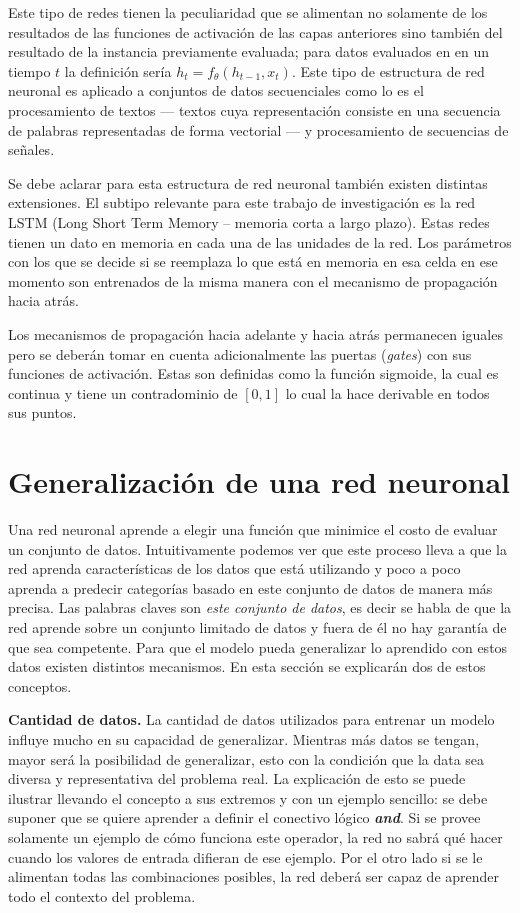 

Este tipo de redes tienen la peculiaridad que se alimentan no solamente de los resultados de las funciones de activación de las capas anteriores sino también del resultado de la instancia previamente evaluada; para datos evaluados en en un tiempo $t$ la definición sería $h_t = f_{\theta}(h_{t-1}, x_t)$. Este tipo de estructura de red neuronal es aplicado a conjuntos de datos secuenciales como lo es el procesamiento de textos --- textos cuya representación consiste en una secuencia de palabras representadas de forma vectorial --- y procesamiento de secuencias de señales.

Se debe aclarar para esta estructura de red neuronal también existen distintas extensiones. El subtipo relevante para este trabajo de investigación es la red LSTM (Long Short Term Memory -- memoria corta a largo plazo). Estas redes tienen un dato en memoria en cada una de las unidades de la red. Los parámetros con los que se decide si se reemplaza lo que está en memoria en esa celda en ese momento son entrenados de la misma manera con el mecanismo de propagación hacia atrás.

Los mecanismos de propagación hacia adelante y hacia atrás permanecen iguales pero se deberán tomar en cuenta adicionalmente las puertas (\textit{gates}) con sus funciones de activación. Estas son definidas como la función sigmoide, la cual es continua y tiene un contradominio de $[0,1]$ lo cual la hace derivable en todos sus puntos.

\section{Generalización de una red neuronal}

Una red neuronal aprende a elegir una función que minimice el costo de evaluar un conjunto de datos. Intuitivamente podemos ver que este proceso lleva a que la red aprenda características de los datos que está utilizando y poco a poco aprenda a predecir categorías basado en este conjunto de datos de manera más precisa. Las palabras claves son \textit{este conjunto de datos}, es decir se habla de que la red aprende sobre un conjunto limitado de datos y fuera de él no hay garantía de que sea competente. Para que el modelo pueda generalizar lo aprendido con estos datos existen distintos mecanismos. En esta sección se explicarán dos de estos conceptos.

\textbf{Cantidad de datos.} La cantidad de datos utilizados para entrenar un modelo influye mucho en su capacidad de generalizar. Mientras más datos se tengan, mayor será la posibilidad de generalizar, esto con la condición que la data sea diversa y representativa del problema real. La explicación de esto se puede ilustrar llevando el concepto a sus extremos y con un ejemplo sencillo: se debe suponer que se quiere aprender a definir el conectivo lógico \textbf{\textit{and}}. Si se provee solamente un ejemplo de cómo funciona este operador, la red no sabrá qué hacer cuando los valores de entrada difieran de ese ejemplo. Por el otro lado si se le alimentan todas las combinaciones posibles, la red deberá ser capaz de aprender todo el contexto del problema.

